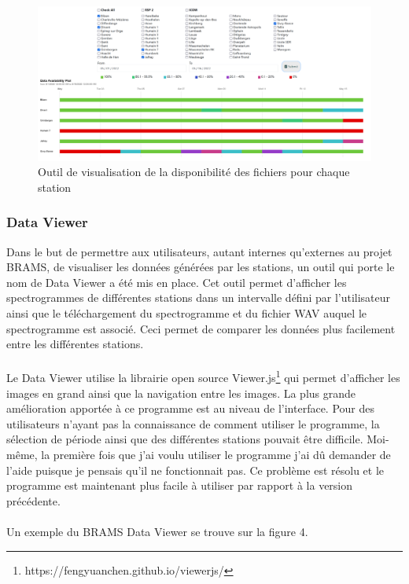 \documentclass[11pt]{article}
\begin{document}
\begin{figure}[t]
    \begin{center}
        \includegraphics[scale=0.155]{availability.png}
        \caption{Outil de visualisation de la disponibilité des fichiers pour chaque station}
    \end{center}
\end{figure}

\subsubsection{Data Viewer}

Dans le but de permettre aux utilisateurs, autant internes qu'externes au projet BRAMS, de visualiser les données générées par les stations, un outil qui porte le nom de Data Viewer a été mis en place.
Cet outil permet d'afficher les spectrogrammes de différentes stations dans un intervalle défini par l'utilisateur ainsi que le téléchargement du spectrogramme et du fichier WAV auquel le spectrogramme est associé.
Ceci permet de comparer les données plus facilement entre les différentes stations.\\
\\
Le Data Viewer utilise la librairie open source Viewer.js\footnote{https://fengyuanchen.github.io/viewerjs/} qui permet d'afficher les images en grand ainsi que la navigation entre les images.
La plus grande amélioration apportée à ce programme est au niveau de l'interface.
Pour des utilisateurs n'ayant pas la connaissance de comment utiliser le programme, la sélection de période ainsi que des différentes stations pouvait être difficile.
Moi-même, la première fois que j'ai voulu utiliser le programme j'ai dû demander de l'aide puisque je pensais qu'il ne fonctionnait pas.
Ce problème est résolu et le programme est maintenant plus facile à utiliser par rapport à la version précédente.\\
\\
Un exemple du BRAMS Data Viewer se trouve sur la figure 4.
\end{document}
